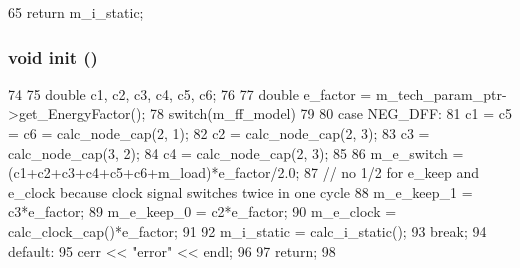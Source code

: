 \begin{DoxyCode}
65 { return m_i_static; }
\end{DoxyCode}
\hypertarget{classFlipFlop_a02fd73d861ef2e4aabb38c0c9ff82947}{
\subsubsection[{init}]{\setlength{\rightskip}{0pt plus 5cm}void init ()}}
\label{classFlipFlop_a02fd73d861ef2e4aabb38c0c9ff82947}



\begin{DoxyCode}
74 {
75     double c1, c2, c3, c4, c5, c6;
76 
77     double e_factor = m_tech_param_ptr->get_EnergyFactor();
78     switch(m_ff_model)
79     {
80         case NEG_DFF:
81             c1 = c5 = c6 = calc_node_cap(2, 1);
82             c2 = calc_node_cap(2, 3);
83             c3 = calc_node_cap(3, 2);
84             c4 = calc_node_cap(2, 3);
85 
86             m_e_switch = (c1+c2+c3+c4+c5+c6+m_load)*e_factor/2.0;
87             // no 1/2 for e_keep and e_clock because clock signal switches twice 
      in one cycle
88             m_e_keep_1 = c3*e_factor;
89             m_e_keep_0 = c2*e_factor;
90             m_e_clock = calc_clock_cap()*e_factor;
91 
92             m_i_static = calc_i_static();
93             break;
94         default:
95             cerr << "error" << endl;
96     }
97     return;
98 }
\end{DoxyCode}



